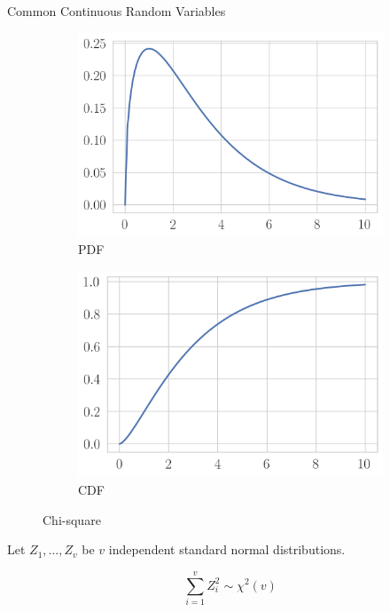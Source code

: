 \documentclass[11pt, xcolor={dvipsnames}, hyperref={colorlinks, allcolors=Blue}]{beamer}
\begin{document}

\begin{frame}{Common Continuous Random Variables}
\begin{figure}[t]
	\begin{subfigure}[b]{0.4\textwidth}
		\centering
		\includegraphics[width=\textwidth]{chisquare_pdf.png}
		\caption*{PDF}
	\end{subfigure}
	\begin{subfigure}[b]{0.4\textwidth}
		\centering
		\includegraphics[width=\textwidth]{chisquare_cdf.png}
		\caption*{CDF}
	\end{subfigure}
\caption{Chi-square}
\end{figure}


Let $Z_1,\dots,Z_v$ be  $v$ independent standard normal distributions.

\[ \sum_{i=1}^{v}Z^{2}_i \sim \chi^{2}(v)\] 

\end{frame}
\end{document}
